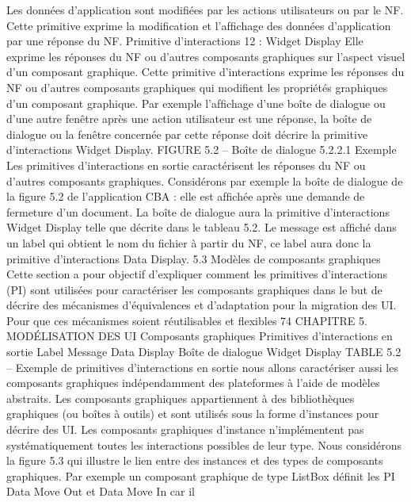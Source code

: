 \documentclass{article}
\begin{document}
Les donn\'{e}es d’application sont modiﬁ\'{e}es par les actions utilisateurs ou par le NF. Cette primitive
exprime la modiﬁcation et l’afﬁchage des donn\'{e}es d’application par une r\'{e}ponse du NF.
Primitive d’interactions 12 : Widget Display
Elle exprime les r\'{e}ponses du NF ou d’autres composants graphiques sur l’aspect visuel d’un composant graphique.
Cette primitive d’interactions exprime les r\'{e}ponses du NF ou d’autres composants graphiques qui
modiﬁent les propri\'{e}t\'{e}s graphiques d’un composant graphique. Par exemple l’afﬁchage d’une bo\^{i}te
de dialogue ou d’une autre fen\^{e}tre apr\`{e}s une action utilisateur est une r\'{e}ponse, la bo\^{i}te de dialogue ou
la fen\^{e}tre concern\'{e}e par cette r\'{e}ponse doit d\'{e}crire la primitive d’interactions Widget Display.
FIGURE 5.2 – Bo\^{i}te de dialogue
5.2.2.1
Exemple
Les primitives d’interactions en sortie caract\'{e}risent les r\'{e}ponses du NF ou d’autres composants
graphiques.
Consid\'{e}rons par exemple la bo\^{i}te de dialogue de la ﬁgure 5.2 de l’application CBA : elle est
afﬁch\'{e}e apr\`{e}s une demande de fermeture d’un document. La bo\^{i}te de dialogue aura la primitive d’interactions Widget Display telle que d\'{e}crite dans le tableau 5.2. Le message est afﬁch\'{e} dans un label
qui obtient le nom du ﬁchier \`{a} partir du NF, ce label aura donc la primitive d’interactions Data Display.
5.3
Mod\`{e}les de composants graphiques
Cette section a pour objectif d’expliquer comment les primitives d’interactions (PI) sont utilis\'{e}es
pour caract\'{e}riser les composants graphiques dans le but de d\'{e}crire des m\'{e}canismes d’\'{e}quivalences
et d’adaptation pour la migration des UI. Pour que ces m\'{e}canismes soient r\'{e}utilisables et ﬂexibles
74
CHAPITRE 5. MODÉLISATION DES UI
Composants
graphiques
Primitives d’interactions en sortie
Label Message
Data Display
Bo\^{i}te de dialogue
Widget Display
TABLE 5.2 – Exemple de primitives d’interactions en sortie
nous allons caract\'{e}riser aussi les composants graphiques ind\'{e}pendamment des plateformes \`{a} l’aide de
mod\`{e}les abstraits.
Les composants graphiques appartiennent \`{a} des biblioth\`{e}ques graphiques (ou bo\^{i}tes \`{a} outils) et
sont utilis\'{e}s sous la forme d’instances pour d\'{e}crire des UI. Les composants graphiques d’instance
n’impl\'{e}mentent pas syst\'{e}matiquement toutes les interactions possibles de leur type. Nous consid\'{e}rons
la ﬁgure 5.3 qui illustre le lien entre des instances et des types de composants graphiques. Par exemple
un composant graphique de type ListBox d\'{e}ﬁnit les PI Data Move Out et Data Move In car il
\end{document}
